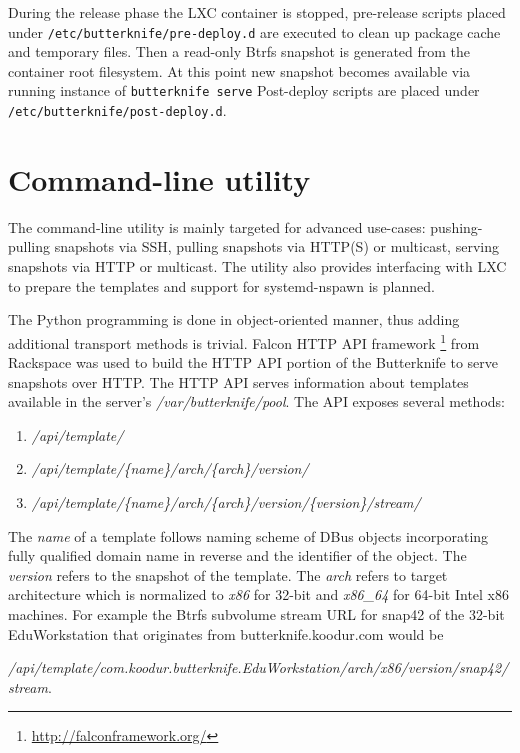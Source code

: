 \documentclass[a4paper,11pt]{kth-mag}
\begin{document}
During the release phase the LXC container is stopped,
pre-release scripts placed under \texttt{/etc/butterknife/pre-deploy.d}
are executed to clean up package cache and temporary files.
Then a read-only Btrfs snapshot is generated from the container root filesystem.
At this point new snapshot becomes available via running instance of
\texttt{butterknife serve}
Post-deploy scripts are placed under \texttt{/etc/butterknife/post-deploy.d}.


\clearpage

\section{Command-line utility}

The command-line utility is mainly targeted for
advanced use-cases:
pushing-pulling snapshots via SSH,
pulling snapshots via HTTP(S) or multicast,
serving snapshots via HTTP or multicast.
The utility also provides interfacing with
LXC to prepare the templates and
support for systemd-nspawn
is planned. \cite{systemd-nspawn}


The Python programming is done in object-oriented manner,
thus adding additional transport methods is trivial.
Falcon HTTP API framework
\footnote{\url{http://falconframework.org/}}
from Rackspace was used to build the
HTTP API portion of the Butterknife to serve
snapshots over HTTP.
The HTTP API serves information about templates
available in the server's \emph{/var/butterknife/pool}.
The API exposes several methods:

\begin{enumerate}
\item \emph{/api/template/}
\item \emph{/api/template/\{name\}/arch/\{arch\}/version/}
\item \emph{/api/template/\{name\}/arch/\{arch\}/version/\{version\}/stream/}
\end{enumerate}

The \emph{name} of a template follows naming scheme of DBus objects
incorporating fully qualified domain name in reverse and the identifier
of the object.
The \emph{version} refers to the snapshot of the template.
The \emph{arch} refers to target architecture which is normalized
to \emph{x86} for 32-bit and \emph{x86\_64} for 64-bit Intel x86 machines.
For example the Btrfs subvolume stream URL for
snap42 of the 32-bit EduWorkstation that originates from butterknife.koodur.com would be

\emph{/api/template/com.koodur.butterknife.EduWorkstation/arch/x86/version/snap42/stream}.
\end{document}
